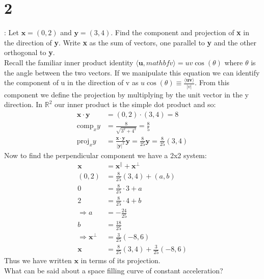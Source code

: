 \documentclass[a4paper, 11pt]{article}
\begin{document}
\section*{2}
: Let $\mathbf{x} = (0,2)$ and $\mathbf{y} = (3,4)$. Find the component and projection of \textbf{x} in the direction of \textbf{y}. Write \textbf{x} as the sum of vectors, one parallel to \textbf{y} and the other orthogonal to \textbf{y}. \\

\noindent Recall the familiar inner product identity $\langle \mathbf{u}, mathbf{v}\rangle = uv\cos(\theta)$ where $\theta$ is the angle between the two vectors. If we manipulate this equation we can identify the component of u in the direction of v as $u\cos(\theta) \equiv \frac{\langle \mathbf{u} \mathbf{v} \rangle}{|v|}$. From this component we define the projection by multiplying by the unit vector in the y direction. In $\mathbb{R}^2$ our inner product is the simple dot product and so: 
	\begin{align*}
		\mathbf{x}\cdot\mathbf{y} &= (0,2) \cdot (3,4) = 8 \\ 
		\text{comp}_xy &= \frac{8}{\sqrt{3^2+4^2}} = \frac{8}{5} \\ 
		\text{proj}_xy &= \frac{\mathbf{x}\cdot\mathbf{y}}{|\mathbf{y}|^2}\mathbf{y} = \frac{8}{25}\mathbf{y} = \frac{8}{25}(3,4)
	\end{align*}
Now to find the perpendicular component we have a 2x2 system: 
	\begin{align*}
		\mathbf{x} &= \mathbf{x}^\parallel + \mathbf{x}^\perp \\ 
		(0,2) &= \frac{8}{25}(3,4) + (a,b) \\ 
		0 &= \frac{8}{25}\cdot3 + a \\ 
		2 &= \frac{8}{25}\cdot4 + b \\ 
		\Rightarrow a &= -\frac{24}{25} \\ 
			b &= \frac{18}{25} \\ 
		\Rightarrow \mathbf{x}^\perp &= \frac{3}{25}(-8, 6) \\ 
		\mathbf{x} &= \frac{8}{25}(3,4)+ \frac{3}{25}(-8, 6)
	\end{align*}
Thus we have written $\mathbf{x}$ in terms of its projection. \\

 What can be said about a space filling curve of constant acceleration? \\
\end{document}
